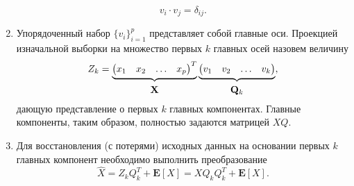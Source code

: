 \documentclass[a4paper]{article}
\begin{document}
\begin{enumerate}
\begin{equation}
        v_i \cdot v_j = \delta_{ij}.
    \end{equation}
    \item Упорядоченный набор $\{v_i\}_{i=1}^p$ представляет собой главные оси. Проекцией изначальной выборки на множество первых $k$ главных осей назовем величину
    \begin{equation}
        Z_k=\underbrace{\begin{pmatrix}x_1&x_2&\hdots&x_p\end{pmatrix}^T}_{\substack{\\[0.2em] \text{\normalsize $\mathbf{X}$}}}\underbrace{\begin{pmatrix}v_1&v_2&\hdots&v_k\end{pmatrix}}_{\substack{\\[0.2em] \text{\normalsize $\mathbf{Q}_k$}}},
    \end{equation}
    дающую представление о первых $k$ главных компонентах. Главные компоненты, таким образом, полностью задаются матрицей $XQ$.
    \item Для восстановления (с потерями) исходных данных на основании первых $k$ главных компонент необходимо выполнить преобразование
    \begin{equation}
        \widehat{X}=Z_k Q_k^T + \mathbf{E}[X]=X Q_k Q_k^T + \mathbf{E}[X].
    \end{equation}
    \end{enumerate}
\end{document}

